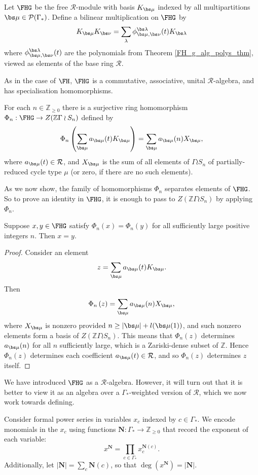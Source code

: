 \begin{definition} 
Let $\FHG$ be the free $\mathcal{R}$-module with basis $K_{\bs \mu}$ indexed by all multipartitions $\bs \mu \in \mathcal{P}(\Gamma_*)$. Define a bilinear multiplication on $\FHG$ by
\[
K_{\bs \mu} K_{\bs \nu} = \sum_{\lambda} \phi_{\bs\mu, \bs\nu}^{\bs\lambda}(t) K_{\bs \lambda}
\]
where $\phi_{\bs\mu, \bs\nu}^{\bs\lambda}(t)$ are the polynomials from Theorem \ref{FH_g_alg_polys_thm}, viewed as elements of the base ring $\mathcal{R}$.
\end{definition}

As in the case of $\FH$, $\FHG$ is a commutative, associative, unital $\mathcal{R}$-algebra, and has specialisation homomorphisms.
\begin{theorem}  \label{thm:FH_g_spec_hom}
For each $n \in \mathbb{Z}_{\geq 0}$ there is a surjective ring homomorphism $\Phi_n: \FHG \to Z(\mathbb{Z}\Gamma \wr S_n)$ defined by
\[
\Phi_n \left( \sum_{\bs \mu} a_{\bs \mu}(t) K_{\bs\mu} \right) = \sum_{\bs \mu} a_{\bs \mu}(n) X_{\bs \mu},
\]
where $a_{\bs\mu}(t) \in \mathcal{R}$, and $X_{\bs\mu}$ is the sum of all elements of $\Gamma \wr S_n$ of partially-reduced cycle type $\mu$ \textup{(}or zero, if there are no such elements\textup{)}.
\end{theorem}

As we now show, the family of homomorphisms $\Phi_n$ separates elements of $\FHG$. So to prove an identity in $\FHG$, it is enough to pass to $Z(\mathbb{Z}\Gamma \wr S_n)$ by applying $\Phi_n$.
\begin{proposition} \label{specialisation_distinguishing_prop}
Suppose $x,y \in \FHG$ satisfy $\Phi_n(x) = \Phi_n(y)$ for all sufficiently large positive integers $n$. Then $x=y$.
\end{proposition}
\begin{proof}
Consider an element
\[
z = \sum_{\bs \mu} a_{\bs \mu}(t) K_{\bs\mu}.
\]
Then
\[
\Phi_n \left(z \right) = \sum_{\bs \mu} a_{\bs \mu}(n) X_{\bs \mu},
\]
where $X_{\bs \mu}$ is nonzero provided $n \geq |\bs \mu| + l(\bs \mu(1))$, and such nonzero elements form a basis of $Z(\mathbb{Z}\Gamma \wr S_n)$. This means that $\Phi_n(z)$ determines $a_{\bs \mu}(n)$ for all $n$ sufficiently large, which is a Zariski-dense subset of $\mathbb{Z}$. Hence $\Phi_n(z)$ determines each coefficient $a_{\bs \mu}(t) \in \mathcal{R}$, and so $\Phi_n(z)$ determines $z$ itself. 
\end{proof}

We have introduced $\FHG$ as a $\mathcal{R}$-algebra. However, it will turn out that it is better to view it as an algebra over a $\Gamma_*$-weighted version of $\mathcal{R}$, which we now work towards defining.
\begin{definition}
Consider formal power series in variables $x_c$ indexed by $c \in \Gamma_*$. We encode monomials in the $x_c$ using functions $\mathbf{N}: \Gamma_* \to \mathbb{Z}_{\geq 0}$ that record the exponent of each variable:
\[
x^{\mathbf{N}} = \prod_{c \in \Gamma_*} x_c^{\mathbf{N}(c)}.
\]
Additionally, let $|\mathbf{N}| = \sum_c \mathbf{N}(c)$, so that $\deg(x^{\mathbf{N}}) = |\mathbf{N}|$.
\end{definition}

